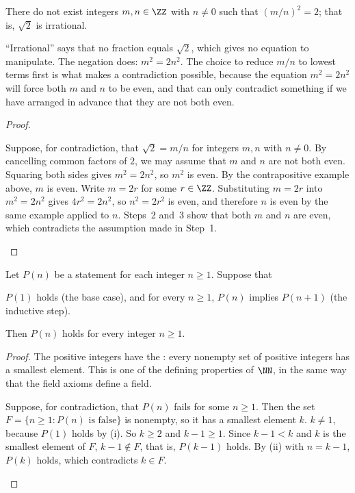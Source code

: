\documentclass[10pt]{scrartcl}
\begin{document}
\begin{proposition*}
  There do not exist integers $m,n\in\ZZ$ with $n\ne 0$ such that $(m/n)^2=2$; that is, $\sqrt{2}$ is irrational.
\end{proposition*}
\begin{ideabox}
  ``Irrational'' says that no fraction equals $\sqrt2$, which gives no equation to manipulate. The negation does: $m^2=2n^2$. The choice to reduce $m/n$ to lowest terms first is what makes a contradiction possible, because the equation $m^2=2n^2$ will force both $m$ and $n$ to be even, and that can only contradict something if we have arranged in advance that they are not both even.
\end{ideabox}
\begin{proof}
  \begin{steps}
    \ii Suppose, for contradiction, that $\sqrt{2}=m/n$ for integers $m,n$ with $n\ne 0$. By cancelling common factors of $2$, we may assume that $m$ and $n$ are not both even.
    \ii Squaring both sides gives $m^2=2n^2$, so $m^2$ is even. By the contrapositive example above, $m$ is even. Write $m=2r$ for some $r\in\ZZ$.
    \ii Substituting $m=2r$ into $m^2=2n^2$ gives $4r^2=2n^2$, so $n^2=2r^2$ is even, and therefore $n$ is even by the same example applied to $n$.
    \ii Steps~2 and~3 show that both $m$ and $n$ are even, which contradicts the assumption made in Step~1.
  \end{steps}
\end{proof}

\begin{proposition*}
  Let $P(n)$ be a statement for each integer $n\ge 1$. Suppose that
  \begin{enumerate}[(i)]
    \ii $P(1)$ holds (the base case), and
    \ii for every $n\ge 1$, $P(n)$ implies $P(n+1)$ (the inductive step).
  \end{enumerate}
  Then $P(n)$ holds for every integer $n\ge 1$.
\end{proposition*}
\begin{proof}
  The positive integers have the : every nonempty set of positive integers has a smallest element. This is one of the defining properties of $\NN$, in the same way that the field axioms define a field.
  \begin{steps}
    \ii Suppose, for contradiction, that $P(n)$ fails for some $n\ge1$. Then the set $F=\{n\ge1: P(n)\text{ is false}\}$ is nonempty, so it has a smallest element $k$.
    \ii $k\ne1$, because $P(1)$ holds by (i). So $k\ge2$ and $k-1\ge1$.
    \ii Since $k-1<k$ and $k$ is the smallest element of $F$, $k-1\notin F$, that is, $P(k-1)$ holds. By (ii) with $n=k-1$, $P(k)$ holds, which contradicts $k\in F$.
  \end{steps}
\end{proof}
\end{document}
